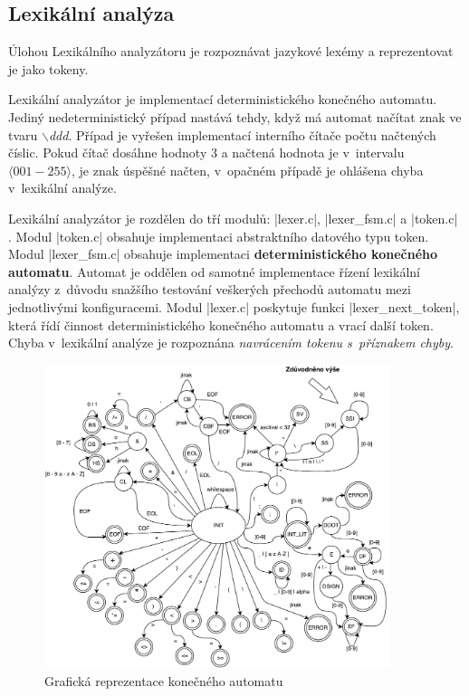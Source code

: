 \subsection{Lexikální analýza}
\label{subsec:lexer}
Úlohou Lexikálního analyzátoru je rozpoznávat jazykové lexémy a reprezentovat
je jako tokeny.

Lexikální analyzátor je implementací deterministického konečného
automatu. Jediný nedeterministický případ nastává tehdy, když má automat načítat znak ve tvaru $\backslash$\emph{ddd}.
Případ je vyřešen implementací interního čítače počtu načtených číslic. Pokud čítač dosáhne hodnoty 3 a načtená hodnota je
v~intervalu $\langle 001 - 255\rangle$, je znak úspěšné načten, v~opačném případě je ohlášena chyba v~lexikální
analýze.

Lexikální analyzátor je rozdělen do tří modulů: \ic|lexer.c|, \ic|lexer_fsm.c| a \ic|token.c|
. Modul \ic|token.c| obsahuje implementaci abstraktního datového typu token. Modul \ic|lexer_fsm.c|
obsahuje implementaci \textbf{deterministického konečného automatu}. Automat je oddělen od samotné implementace řízení lexikální analýzy z~důvodu snažšího testování veškerých přechodů automatu mezi jednotlivými konfiguracemi. Modul \ic|lexer.c| poskytuje funkci
\ic|lexer_next_token|, která řídí činnost deterministického konečného automatu a vrací další token. Chyba v~lexikální analýze je rozpoznána \emph{navrácením tokenu s~příznakem chyby}.

\begin{figure}[htbp]
    \label{subsec:automat}
    \caption{Grafická reprezentace konečného automatu}
    \centering
    \includegraphics[width=0.9\textwidth, angle=0]{src/assets/automat.pdf}
\end{figure}

